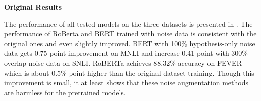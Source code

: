 \noindent\textbf{Original Results}

The performance of all tested models on the three datasets 
is presented in .
The performance of RoBerta  and BERT trained with noise data 
is consistent with the original ones and even slightly improved. 
BERT with 100\% hypothesis-only noise data gets 0.75 point improvement on MNLI 
and increase 0.41 point with 300\% overlap noise data on SNLI. 
RoBERTa achieves 88.32\% accuracy on FEVER which is about 0.5\% point 
higher than the original dataset training. Though this improvement is small, it at least shows 
that these noise augmentation methods are harmless for the pretrained models.


